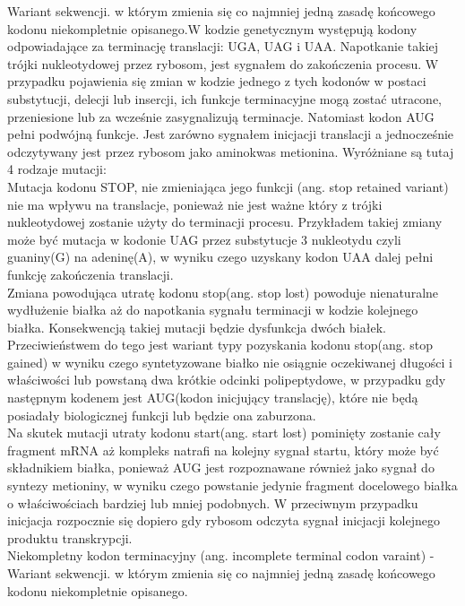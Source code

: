 \documentclass[12pt]{article}
\begin{document}
Wariant sekwencji. w którym zmienia się co najmniej jedną zasadę końcowego kodonu niekompletnie opisanego.W kodzie genetycznym występują kodony odpowiadające za terminację translacji: UGA, UAG i UAA. Napotkanie takiej trójki nukleotydowej przez rybosom, jest sygnałem do zakończenia procesu. W przypadku pojawienia się zmian w kodzie jednego z tych kodonów w postaci substytucji, delecji lub insercji, ich funkcje terminacyjne mogą zostać utracone, przeniesione lub za wcześnie zasygnalizują terminacje. Natomiast kodon AUG pełni podwójną funkcje. Jest zarówno sygnałem inicjacji translacji a jednocześnie odczytywany jest przez rybosom jako aminokwas metionina. Wyróżniane są tutaj 4 rodzaje mutacji: \\
Mutacja kodonu STOP, nie zmieniająca jego funkcji (ang. stop retained variant) nie ma wpływu na translacje, ponieważ nie jest ważne który z trójki nukleotydowej zostanie użyty do terminacji procesu. Przykładem takiej zmiany może być mutacja w kodonie UAG przez substytucje 3 nukleotydu czyli guaniny(G) na adeninę(A), w wyniku czego uzyskany kodon UAA dalej pełni funkcję zakończenia translacji. \\
\indent Zmiana powodująca utratę kodonu stop(ang. stop lost) powoduje nienaturalne wydłużenie białka aż do napotkania sygnału terminacji w kodzie kolejnego białka. Konsekwencją takiej mutacji będzie dysfunkcja dwóch białek. \\
\indent Przeciwieństwem do tego jest wariant typy pozyskania kodonu stop(ang. stop gained) w wyniku czego syntetyzowane białko nie osiągnie oczekiwanej długości i właściwości lub powstaną dwa krótkie odcinki polipeptydowe, w przypadku gdy następnym kodenem jest AUG(kodon inicjujący translację), które nie będą posiadały biologicznej funkcji lub będzie ona zaburzona. \\
\indent Na skutek mutacji utraty kodonu start(ang. start lost) pominięty zostanie cały fragment mRNA aż kompleks natrafi na kolejny sygnał startu, który może być składnikiem białka, ponieważ AUG jest rozpoznawane również jako sygnał do syntezy metioniny, w wyniku czego powstanie jedynie fragment docelowego białka o właściwościach bardziej lub mniej podobnych. W przeciwnym przypadku inicjacja rozpocznie się dopiero gdy rybosom odczyta sygnał inicjacji kolejnego produktu transkrypcji. \\
\indent Niekompletny kodon terminacyjny (ang. incomplete terminal codon varaint) - Wariant sekwencji. w którym zmienia się co najmniej jedną zasadę końcowego kodonu niekompletnie opisanego. \\
\end{document}
